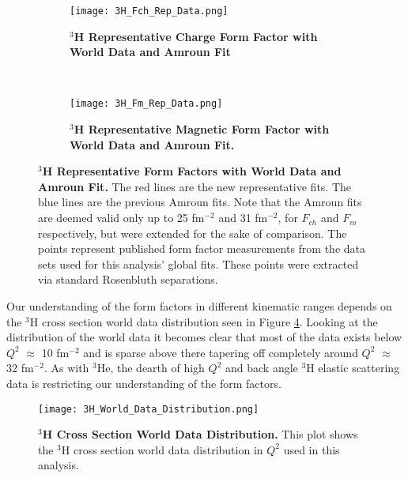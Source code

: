  \begin{figure}[!ht]
\begin{subfigure}{1.\textwidth}
  \centering
  \texttt{[image: 3H\_Fch\_Rep\_Data.png]}
  \caption{\bf{$^3$H Representative Charge Form Factor with World Data and Amroun Fit}}
  \label{fig:3h_fch_rep_data}
\end{subfigure}\\
\begin{subfigure}{1.\textwidth}
  \centering
  \texttt{[image: 3H\_Fm\_Rep\_Data.png]}
  \caption{\bf{$^3$H Representative Magnetic Form Factor with World Data and Amroun Fit.}}
  \label{fig:3h_fm_rep_data}
\end{subfigure}
\caption[$^3$H Representative Form Factors with World Data and Amroun Fit] {
{\bf{$^3$H Representative Form Factors with World Data and Amroun Fit.}} The red lines are the new representative fits. The blue lines are the previous Amroun fits. Note that the Amroun fits are deemed valid only up to 25 fm$^{-2}$ and 31 fm$^{-2}$, for $F_{ch}$ and $F_m$ respectively, but were extended for the sake of comparison. The points represent published form factor measurements from the data sets used for this analysis' global fits. These points were extracted via standard Rosenbluth separations.}
\label{fig:3h_rep_data}
\end{figure}

Our understanding of the form factors in different kinematic ranges depends on the $^3$H cross section world data distribution seen in Figure \ref{fig:3h_data_distribution}. Looking at the distribution of the world data it becomes clear that most of the data exists below $Q^2$ $\approx$ 10 fm$^{-2}$ and is sparse above there tapering off completely around $Q^2$ $\approx$ 32 fm$^{-2}$. As with $^3$He, the dearth of high $Q^2$ and back angle $^3$H elastic scattering data is restricting our understanding of the form factors.

\begin{figure}[!ht]
	\begin{center}
	\texttt{[image: 3H\_World\_Data\_Distribution.png]}
	\end{center}
	\caption[$^3$H Cross Section World Data Distribution]{
	{\bf{$^3$H Cross Section World Data Distribution.}} This plot shows the $^3$H cross section world data distribution in $Q^2$ used in this analysis.}
	\label{fig:3h_data_distribution}
\end{figure}


